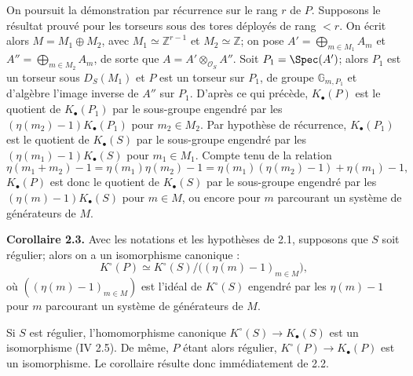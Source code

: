 On
poursuit la démonstration par récurrence sur le rang $r$ de $P$. Supposons le résultat prouvé pour les torseurs sous des tores déployés de rang $<r$. On écrit alors $M=M_1\oplus M_2$, avec $M_1\simeq\mathbb Z^{r-1}$ et $M_2\simeq\mathbb Z$; on pose $A'=\bigoplus_{m\in M_1}A_m$ et $A''=\bigoplus_{m\in M_2}A_m$, de sorte que $A=A'\otimes_{\mathcal O_S}A''$. Soit $P_1=\Spec(A')$; alors $P_1$ est un torseur sous $D_S(M_1)$ et $P$ est un torseur sur $P_1$, de groupe $\mathbb G_{m,P_1}$ et d'algèbre l'image inverse de $A''$ sur $P_1$. D'après ce qui précède, $K_\bullet(P)$ est le quotient de $K_\bullet(P_1)$ par le sous-groupe engendré par les $(\eta(m_2)-1)K_\bullet(P_1)$ pour $m_2\in M_2$. Par hypothèse de récurrence, $K_\bullet(P_1)$ est le quotient de $K_\bullet(S)$ par le sous-groupe engendré par les $(\eta(m_1)-1)K_\bullet(S)$ pour $m_1\in M_1$. Compte tenu de la relation
\[
\eta(m_1+m_2)-1=\eta(m_1)\eta(m_2)-1
=\eta(m_1)(\eta(m_2)-1)+\eta(m_1)-1,
\]
$K_\bullet(P)$ est donc le quotient de $K_\bullet(S)$ par le sous-groupe engendré par les $(\eta(m)-1)K_\bullet(S)$ pour $m\in M$, ou encore pour $m$ parcourant un système de générateurs de $M$.

\textbf{Corollaire 2.3.} Avec les notations et les hypothèses de 2.1, supposons que $S$ soit régulier; alors on a un isomorphisme canonique :
\[
K^\circ(P)\simeq K^\circ(S)/\bigl((\eta(m)-1)_{m\in M}\bigr),
\]
où $((\eta(m)-1)_{m\in M})$ est l'idéal de $K^\circ(S)$ engendré par les $\eta(m)-1$ pour $m$ parcourant un système de générateurs de $M$.

Si $S$ est régulier, l'homomorphisme canonique $K^\circ(S)\to K_\bullet(S)$ est un isomorphisme (IV 2.5). De même, $P$ étant alors régulier, $K^\circ(P)\to K_\bullet(P)$ est un isomorphisme. Le corollaire résulte donc immédiatement de 2.2.

